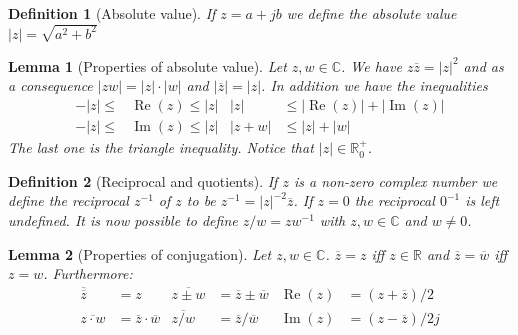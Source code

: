 \documentclass[twocolumn, margin=small]{tex/hsrzf}
\newcommand\Rset{\mathbb{R}}
\newcommand\Cset{\mathbb{C}}
\newcommand\conj[1]{\overline{#1}}
\newcommand\len[1]{\lvert#1\rvert}
\renewcommand\Re{\operatorname{Re}}
\renewcommand\Im{\operatorname{Im}}
\theoremstyle{komfourzf}
\newtheorem{definition}{Definition}
\newtheorem{lemma}{Lemma}
\begin{document}
\begin{definition}[Absolute value]
  If \(z = a + jb\) we define the \emph{absolute value} \(\len{z} = \sqrt{a^2 + b^2}\)
\end{definition}

\begin{lemma}[Properties of absolute value]
  Let \(z,w\in\Cset\). We have \(z\conj{z} = \len{z}^2\) and as a consequence \(\len{zw} = \len{z}\cdot\len{w}\) and \(\len{\conj{z}} = \len{z}\). In addition we have the inequalities
  \begin{align*}
    -\len{z} \leq &\Re(z) \leq \len{z} &
    \len{z} &\leq \len{\Re(z)} + \len{\Im(z)} \\
    -\len{z} \leq &\Im(z) \leq \len{z} &
    \len{z + w} &\leq \len{z} + \len{w}
  \end{align*}
  The last one is the \emph{triangle inequality}. Notice that \(\len{z} \in\Rset^+_0\).
\end{lemma}

\begin{definition}[Reciprocal and quotients]
  If \(z\) is a non-zero complex number we define the \emph{reciprocal} \(z^{-1}\) of \(z\) to be \(z^{-1} = \len{z}^{-2}\conj{z}\). If \(z = 0\) the reciprocal \(0^{-1}\) is left undefined.
  It is now possible to define \(z/w = zw^{-1}\) with \(z,w \in\Cset\) and \(w \neq 0\).
\end{definition}

\begin{lemma}[Properties of conjugation]
  Let \(z,w \in\Cset\).
  \(\conj{z} = z\) iff \(z \in \Rset\) and \(\conj{z} = \conj{w}\) iff \(z = w\).
  Furthermore:
  \begin{align*}
    \conj{\conj{z}} &= z &
    \conj{z \pm  w} &= \conj{z} \pm \conj{w} &
    \Re(z) &= (z + \conj{z})/2 \\
    \conj{z\cdot w} &= \conj{z}\cdot\conj{w} &
    \conj{z/w} &= \conj{z}/\conj{w} &
    \Im(z) &= (z - \conj{z})/2j
  \end{align*}
\end{lemma}
\end{document}
